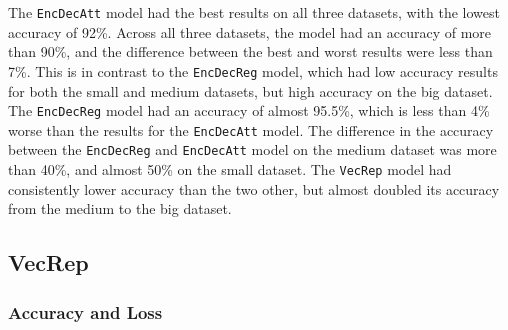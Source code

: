The {\tt EncDecAtt} model had the best results on all three datasets, with the lowest accuracy of 92\%. Across all three datasets, the model had an accuracy of more than 90\%, and the difference between the best and worst results were less than 7\%. This is in contrast to the {\tt EncDecReg} model, which had low accuracy results for both the small and medium datasets, but high accuracy on the big dataset. The {\tt EncDecReg} model had an accuracy of almost 95.5\%, which is less than 4\% worse than the results for the {\tt EncDecAtt} model. The difference in the accuracy between the {\tt EncDecReg} and {\tt EncDecAtt} model on the medium dataset was more than 40\%, and almost 50\% on the small dataset. The {\tt VecRep} model had consistently lower accuracy than the two other, but almost doubled its accuracy from the medium to the big dataset.

\subsection{VecRep}
\subsubsection{Accuracy and Loss}

\newpage
